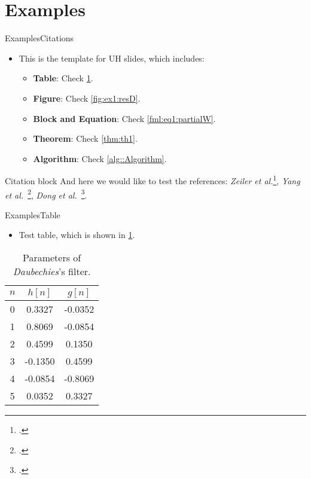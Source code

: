 \documentclass[10pt,xcolor={dvipsnames},aspectratio=169]{beamer}
\begin{document}
\section{Examples}
\begin{frame}{Examples}{Citations}
\begin{itemize}
  \item This is the template for UH slides, which includes:
  \begin{itemize}
    \item \textbf{Table}: Check \cref{tab:params}.
    \item \textbf{Figure}: Check \cref{fig:ex1:resD}.
    \item \textbf{Block and Equation}: Check \eqref{fml:eq1:partialW}.
    \item \textbf{Theorem}: Check \cref{thm:th1}.
    \item \textbf{Algorithm}: Check \cref{alg::Algorithm}.
  \end{itemize}
\end{itemize}
\begin{block}{Citation block}
  And here we would like to test the references: \textit{Zeiler et al.}\footcite{Zeiler5539957}, \textit{Yang et al.}~\footcite{Yang6175956}, \textit{Dong et al.}~\footcite{Dong7115171}.
\end{block}
\end{frame}


\begin{frame}{Examples}{Table}
\begin{itemize}
  \item Test table, which is shown in \cref{tab:params}.
\end{itemize}

\begin{table}[htbp]
  \centering
  \normalsize
  \caption[Parameters of Daubechies's filter.]{Parameters of \textit{Daubechies}'s filter.}
  \label{tab:params}
  \begin{tabular}{|c|c|c|}
    \hline
    $n$ & $h[n]$ & $g[n]$ \\ \hline
    0 &  0.3327 & -0.0352 \\ \hline
    1 &  0.8069 & -0.0854 \\ \hline
    2 &  0.4599 &  0.1350 \\ \hline
    3 & -0.1350 &  0.4599 \\ \hline
    4 & -0.0854 & -0.8069 \\ \hline
    5 &  0.0352 &  0.3327 \\ \hline
  \end{tabular}
\end{table}
\end{frame}
\end{document}
